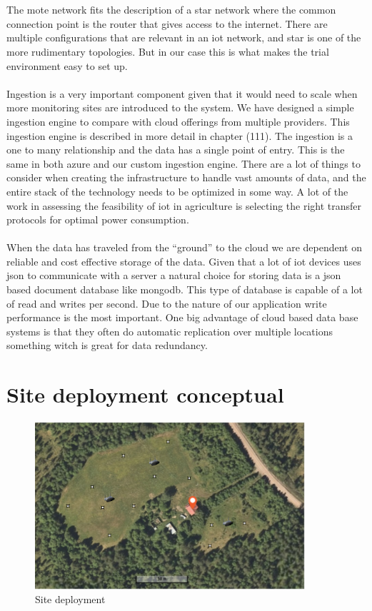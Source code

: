 \documentclass[]{uiophd}
\begin{document}
\\\\
The mote network fits the description of a star network where the common connection point is the router that gives access to the internet. There are multiple configurations that are relevant in an iot network, and star is one of the more rudimentary topologies. But in our case this is what makes the trial environment easy to set up.
\\\\
Ingestion is a very important component given that it would need to scale when more monitoring sites are introduced to the system. We have designed a simple ingestion engine to compare with cloud offerings from multiple providers. This ingestion engine is described in more detail in chapter (111). The ingestion is a one to many relationship and the data has a single point of entry. This is the same in both azure and our custom ingestion engine. There are a lot of things to consider when creating the infrastructure to handle vast amounts of data, and the entire stack of the technology needs to be optimized in some way. A lot of the work in assessing the feasibility of iot in agriculture is selecting the right transfer protocols for optimal power consumption.
\\\\
 When the data has traveled from the “ground” to the cloud we are dependent on reliable and cost effective storage of the data. Given that a lot of iot devices uses json to communicate with a server a natural choice for storing data is a json based document database like mongodb. This type of database is capable of a lot of read and writes per second. Due to the nature of our application write performance is the most important. One big advantage of cloud based data base systems is that they often do automatic replication over multiple locations something witch is great for data redundancy.
 
 \section{Site deployment conceptual}
 \begin{figure}[h]
\caption{Site deployment}
\centering
\includegraphics[width=10cm]{hjemly.png}
\end{figure}
\end{document}
